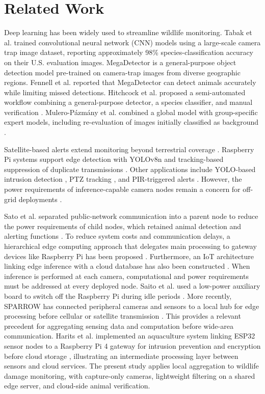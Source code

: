 \documentclass[conference]{IEEEtran}
\begin{document}
\section{Related Work}

Deep learning has been widely used to streamline wildlife monitoring. Tabak et al. \cite{Tabak2019} trained convolutional neural network (CNN) models using a large-scale camera trap image dataset, reporting approximately 98\% species-classification accuracy on their U.S. evaluation images. MegaDetector \cite{Beery2019} is a general-purpose object detection model pre-trained on camera-trap images from diverse geographic regions. Fennell et al. \cite{Fennell2022} reported that MegaDetector can detect animals accurately while limiting missed detections. Hitchcock et al. proposed a semi-automated workflow combining a general-purpose detector, a species classifier, and manual verification \cite{rs18030502}. Mulero-P{\'a}zm{\'a}ny et al. combined a global model with group-specific expert models, including re-evaluation of images initially classified as background \cite{Mulero2025}.

Satellite-based alerts extend monitoring beyond terrestrial coverage \cite{Whytock2023}. Raspberry Pi systems support edge detection with YOLOv8n \cite{Patkar2025} and tracking-based suppression of duplicate transmissions \cite{Computers2025}. Other applications include YOLO-based intrusion detection \cite{10716895,11459678}, PTZ tracking \cite{SMC2024}, and PIR-triggered alerts \cite{11337723}. However, the power requirements of inference-capable camera nodes remain a concern for off-grid deployments \cite{IEICE2020,Sato2022}.

Sato et al. separated public-network communication into a parent node to reduce the power requirements of child nodes, which retained animal detection and alerting functions \cite{Sato2022}. To reduce system costs and communication delays, a hierarchical edge computing approach that delegates main processing to gateway devices like Raspberry Pi has been proposed \cite{8912138}. Furthermore, an IoT architecture linking edge inference with a cloud database has also been constructed \cite{9345858}. When inference is performed at each camera, computational and power requirements must be addressed at every deployed node. Saito et al. used a low-power auxiliary board to switch off the Raspberry Pi during idle periods \cite{IEICE2020}. More recently, SPARROW has connected peripheral cameras and sensors to a local hub for edge processing before cellular or satellite transmission \cite{SPARROW2026}. This provides a relevant precedent for aggregating sensing data and computation before wide-area communication. Harits et al. implemented an aquaculture system linking ESP32 sensor nodes to a Raspberry Pi 4 gateway for intrusion prevention and encryption before cloud storage \cite{Harits2025ECIS}, illustrating an intermediate processing layer between sensors and cloud services. The present study applies local aggregation to wildlife damage monitoring, with capture-only cameras, lightweight filtering on a shared edge server, and cloud-side animal verification.
\end{document}

